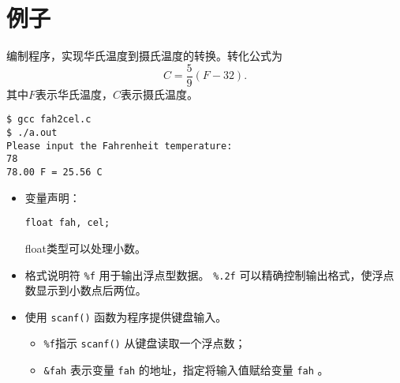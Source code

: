 \section{例子}

\begin{frame}[fragile]\ft{\secname}
  \begin{question}[]{}
  编制程序，实现华氏温度到摄氏温度的转换。转化公式为
  $$
  C = \frac59 (F-32).
  $$
  其中$F$表示华氏温度，$C$表示摄氏温度。    
  \end{question}
\end{frame}

\begin{frame}[fragile]\ft{\secname}

  
\end{frame}

\begin{frame}[fragile]\ft{\secname}

\begin{lstlisting}[backgroundcolor=\color{red!10}]
$ gcc fah2cel.c 
$ ./a.out
Please input the Fahrenheit temperature:
78
78.00 F = 25.56 C
\end{lstlisting}
\end{frame}


\begin{frame}[fragile]\ft{\secname}
\begin{itemize}
\item 变量声明：
\begin{lstlisting}
float fah, cel;
\end{lstlisting}
float类型可以处理小数。\\[0.1in]
\item 格式说明符 \lstinline|%f| 用于输出浮点型数据。 \lstinline|%.2f| 可以精确控制输出格式，使浮点数显示到小数点后两位。\\[0.1in]
\item 使用 \lstinline|scanf()| 函数为程序提供键盘输入。 \\[.1in]
  \begin{itemize}
  \item \lstinline|%f|指示 \lstinline|scanf()| 从键盘读取一个浮点数；\\[.1in]
  \item \lstinline|&fah| 表示变量 \lstinline|fah| 的地址，指定将输入值赋给变量 \lstinline|fah| 。
  \end{itemize}

\end{itemize}
\end{frame}


